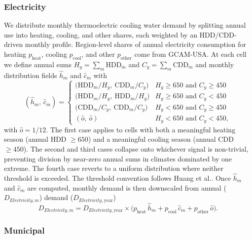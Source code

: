 \documentclass[fleqn,10pt]{wlscirep}
\begin{document}
\subsubsection*{Electricity}

We distribute monthly thermoelectric cooling water demand by splitting annual use into heating, cooling, and other shares, each weighted by an HDD/CDD-driven monthly profile. Region-level shares of annual electricity consumption for heating $p_{\mathrm{heat}}$, cooling $p_{\mathrm{cool}}$, and other $p_{\mathrm{other}}$ come from GCAM-USA. At each cell we define annual sums $H_y = \sum_m \text{HDD}_m$ and $C_y = \sum_m \text{CDD}_m$ and monthly distribution fields $\hat{h}_m$ and $\hat{c}_m$ with
\begin{equation}
(\hat{h}_m,\,\hat{c}_m) =
\begin{cases}
\big(\text{HDD}_m / H_y,\ \text{CDD}_m / C_y\big)      & H_y \ge 650 \text{ and } C_y \ge 450 \\[2pt]
\big(\text{HDD}_m / H_y,\ \text{HDD}_m / H_y\big)      & H_y \ge 650 \text{ and } C_y < 450 \\[2pt]
\big(\text{CDD}_m / C_y,\ \text{CDD}_m / C_y\big)      & H_y < 650 \text{ and } C_y \ge 450 \\[2pt]
(\hat{o},\ \hat{o})                                          & H_y < 650 \text{ and } C_y < 450,
\end{cases}
\label{eq:elec-cases}
\end{equation}
with $\hat{o} = 1/12$. 
The first case applies to cells with both a meaningful heating season (annual HDD $\ge 650$) and a meaningful cooling season (annual CDD $\ge 450$). The second and third cases collapse onto whichever signal is non-trivial, preventing division by near-zero annual sums in climates dominated by one extreme. The fourth case reverts to a uniform distribution where neither threshold is exceeded. The threshold convention follows Huang et al.\cite{Huang2018}. Once $\hat{h}_m$ and $\hat{c}_m$ are computed, monthly demand is then downscaled from annual ($D_{Electricity,m}$) demand ($D_{Electricity,\mathrm{year}}$)
\begin{equation}
D_{Electricity,m} = D_{Electricity,\mathrm{year}} \times \big(p_{\mathrm{heat}}\,\hat{h}_m + p_{\mathrm{cool}}\,\hat{c}_m + p_{\mathrm{other}}\,\hat{o}\big).
\label{eq:elec-demand}
\end{equation}


\subsubsection*{Municipal}
\end{document}
